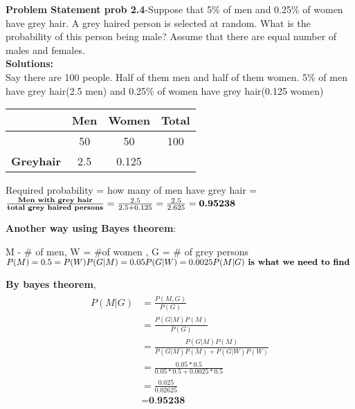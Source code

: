 \documentclass[journal,12pt,twocoloums]{IEEEtran}
\begin{document}
 \maketitle
 
 \textbf{Problem Statement prob 2.4}-Suppose that 5\% of men and 0.25\% of women
have grey hair. A grey haired person is selected at random. What is the probability of this person being male? Assume that there are
equal number of males and females.\\
\textbf{Solutions:}\\
Say there are 100 people. Half of them men and half of them women. 5\% of men have grey hair(2.5 men) and 0.25\% of women have grey hair(0.125 women)


\begin{center}
\begin{tabular}{ |c|c|c|c| } 
\hline
 & \textbf{Men} & \textbf{Women} & \textbf{Total} \\
\hline
 & 50 & 50 & 100 \\ 
\hline
\textbf{Greyhair} & 2.5 & 0.125 & \\ 
 \hline
\end{tabular}
\end{center}


 Required probability = how many of men have grey hair = $\frac{\textbf{Men with grey hair}}{\textbf{total grey haired persons}} \\ = \frac{2.5}{2.5+0.125} \\ = \frac{2.5}{2.625} \\ = \textbf{0.95238} $ 
 
\textbf{ Another way using Bayes theorem}:

M - # of men, W = #of women , G = # of grey persons
$P(M) = 0.5 = P(W) \\ P(G|M) =0.05 \\ P(G|W) = 0.0025 \\ P(M|G) \textbf{ is what we need to find } $

\textbf{By bayes theorem}, 
\begin{multline*}
\begin{split}
P(M|G) & = \frac{P(M,G)}{P(G)} \\
 & = \frac{P(G|M)P(M)}{P(G)} \\
 & = \frac{P(G|M)P(M)}{P(G|M)P(M)+P(G|W)P(W)} \\
 & = \frac{0.05*0.5}{0.05*0.5+0.0025*0.5} \\
 & = \frac{0.025}{0.02625} \\
 & = \textbf{0.95238}
\end{split}
\end{multline*}
\end{document}
